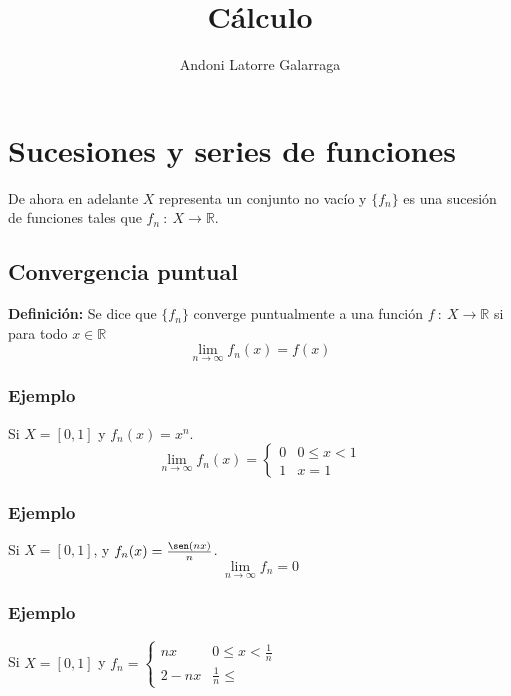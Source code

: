 \documentclass{article}
\title{Cálculo}
\author{Andoni Latorre Galarraga}
\date{}
\newcommand{\R}{\mathbb{R}}
\begin{document}
\maketitle


\section{Sucesiones y series de funciones}


De ahora en adelante $X$ representa un conjunto no vacío y $\{f_n\}$ es una sucesión de funciones tales que $f_n\::\:X\longrightarrow\R$.
\subsection{Convergencia puntual}

\textbf{Definición:} Se dice que $\{f_n\}$ converge puntualmente a una función $f\::\:X\longrightarrow\R$ si para todo $x\in \R$
$$
\lim_{n\to\infty}f_n(x)=f(x)
$$

\subsubsection{Ejemplo}

Si $X=[0,1]$ y $f_n(x)=x^n$.
$$
\lim_{n\to\infty}f_n(x)=
\left\{
    \begin{array}{ll}
        0 & 0\le x<1 \\
        1 & x=1
    \end{array}
\right.
$$

\subsubsection{Ejemplo}

Si $X=[0,1]$, y $f_n(x)=\frac{\sen(nx)}{n}$.
$$
\lim_{n\to\infty} f_n = 0
$$

\subsubsection{Ejemplo}

Si $X=[0,1]$ y $f_n= \left\{\begin{array}{ll}
    nx & 0\le x<\frac{1}{n} \\
    2-nx & \frac{1}{n} \le 
\end{array}\right.$
\end{document}
